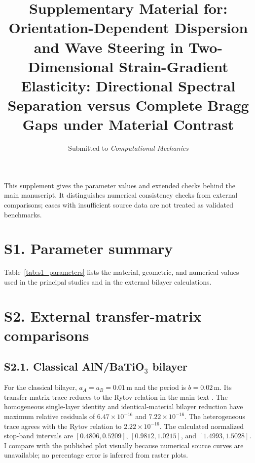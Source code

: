 \documentclass[pdflatex,sn-basic,Numbered]{sn-jnl}
\begin{document}
\title[Supplementary Material: Orientation-Dependent Dispersion and Wave Steering]{Supplementary Material for: Orientation-Dependent Dispersion and Wave Steering in Two-Dimensional Strain-Gradient Elasticity: Directional Spectral Separation versus Complete Bragg Gaps under Material Contrast}

\subtitle{Submitted to \textit{Computational Mechanics}}

\author*[1]{ }


\maketitle

\noindent This supplement gives the parameter values and extended checks behind the main manuscript. It distinguishes numerical consistency checks from external comparisons; cases with insufficient source data are not treated as validated benchmarks.

\section*{S1. Parameter summary}
Table~\ref{tab:s1_parameters} lists the material, geometric, and numerical values used in the principal studies and in the external bilayer calculations.


\section*{S2. External transfer-matrix comparisons}
\subsection*{S2.1. Classical AlN/BaTiO$_3$ bilayer}
For the classical bilayer, $a_A=a_B=0.01\,\mathrm{m}$ and the period is $b=0.02\,\mathrm{m}$. Its transfer-matrix trace reduces to the Rytov relation in the main text \cite{li2024anchorB,zhengwei2009}. The homogeneous single-layer identity and identical-material bilayer reduction have maximum relative residuals of $6.47\times10^{-16}$ and $7.22\times10^{-16}$. The heterogeneous trace agrees with the Rytov relation to $2.22\times10^{-16}$. The calculated normalized stop-band intervals are $[0.4806,0.5209]$, $[0.9812,1.0215]$, and $[1.4993,1.5028]$. I compare with the published plot visually because numerical source curves are unavailable; no percentage error is inferred from raster plots.
\end{document}
